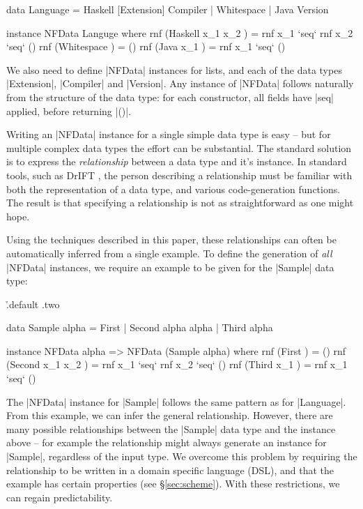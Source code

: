 \documentclass{llncs}
\begin{document}
\begin{code}
data Language  =  Haskell [Extension] Compiler
               |  Whitespace
               |  Java Version

instance NFData Languge where
    rnf (Haskell x_1 x_2  ) = rnf x_1 `seq` rnf x_2 `seq` ()
    rnf (Whitespace       ) = ()
    rnf (Java x_1         ) = rnf x_1 `seq` ()
\end{code}

We also need to define |NFData| instances for lists, and each of the data types |Extension|, |Compiler| and |Version|. Any instance of |NFData| follows naturally from the structure of the data type: for each constructor, all fields have |seq| applied, before returning |()|.

Writing an |NFData| instance for a single simple data type is easy -- but for multiple complex data types the effort can be substantial. The standard solution is to express the \textit{relationship} between a data type and it's instance. In standard tools, such as DrIFT \cite{drift}, the person describing a relationship must be familiar with both the representation of a data type, and various code-generation functions. The result is that specifying a relationship is not as straightforward as one might hope.

Using the techniques described in this paper, these relationships can often be automatically inferred from a single example. To define the generation of \textit{all} |NFData| instances, we require an example to be given for the |Sample| data type:

\h{.default .two}\begin{code}
data Sample alpha  =  First
                   |  Second alpha alpha
                   |  Third alpha

instance NFData alpha => NFData (Sample alpha) where
    rnf (First           ) = ()
    rnf (Second x_1 x_2  ) = rnf x_1 `seq` rnf x_2 `seq` ()
    rnf (Third x_1       ) = rnf x_1 `seq` ()
\end{code}

The |NFData| instance for |Sample| follows the same pattern as for |Language|. From this example, we can infer the general relationship. However, there are many possible relationships between the |Sample| data type and the instance above -- for example the relationship might always generate an instance for |Sample|, regardless of the input type. We overcome this problem by requiring the relationship to be written in a domain specific language (DSL), and that the example has certain properties (see \S\ref{sec:scheme}). With these restrictions, we can regain predictability.
\end{document}
